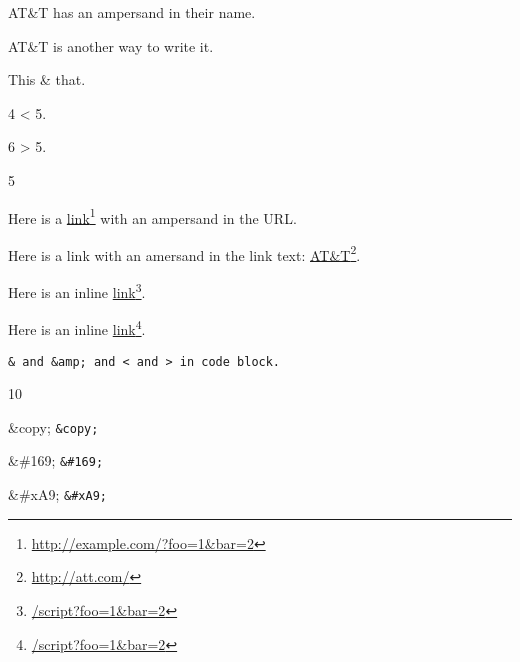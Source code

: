
\def\mytitle{Amps and Angles}


AT\&T has an ampersand in their name.

AT\&T is another way to write it.

This \& that.

4 < 5.

6 > 5.

5

Here is a \href{http://example.com/?foo=1&bar=2}{link}\footnote{\href{http://example.com/?foo=1&bar=2}{http:\slash \slash example.com\slash ?foo=1\&bar=2}} with an ampersand in the URL.

Here is a link with an amersand in the link text: \href{http://att.com/}{AT\&T}\footnote{\href{http://att.com/}{http:\slash \slash att.com\slash }}.

Here is an inline \href{/script?foo=1&bar=2}{link}\footnote{\href{/script?foo=1&bar=2}{\slash script?foo=1\&bar=2}}.

Here is an inline \href{/script?foo=1&bar=2}{link}\footnote{\href{/script?foo=1&bar=2}{\slash script?foo=1\&bar=2}}.

\begin{verbatim}
& and &amp; and < and > in code block.
\end{verbatim}

10

\&copy; \texttt{\&copy;}

\&\#169; \texttt{\&\#169;}

\&\#xA9; \texttt{\&\#xA9;}



